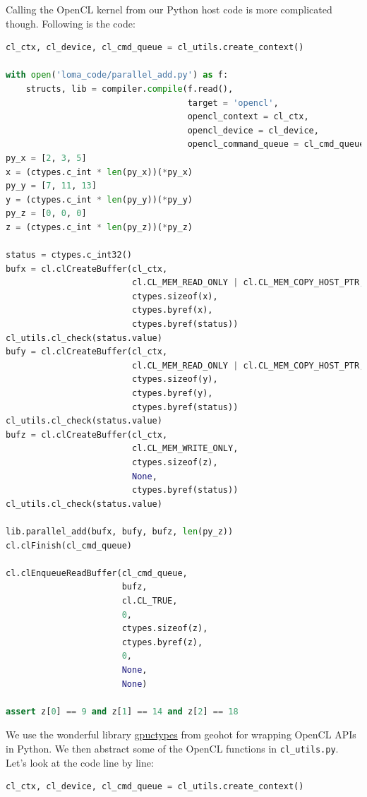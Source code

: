 Calling the OpenCL kernel from our Python host code is more complicated though. Following is the code:
\begin{lstlisting}[language=python]
cl_ctx, cl_device, cl_cmd_queue = cl_utils.create_context()

with open('loma_code/parallel_add.py') as f:
    structs, lib = compiler.compile(f.read(),
                                    target = 'opencl',
                                    opencl_context = cl_ctx,
                                    opencl_device = cl_device,
                                    opencl_command_queue = cl_cmd_queue)
py_x = [2, 3, 5]
x = (ctypes.c_int * len(py_x))(*py_x)
py_y = [7, 11, 13]
y = (ctypes.c_int * len(py_y))(*py_y)
py_z = [0, 0, 0]
z = (ctypes.c_int * len(py_z))(*py_z)

status = ctypes.c_int32()
bufx = cl.clCreateBuffer(cl_ctx,
                         cl.CL_MEM_READ_ONLY | cl.CL_MEM_COPY_HOST_PTR,
                         ctypes.sizeof(x),
                         ctypes.byref(x),
                         ctypes.byref(status))
cl_utils.cl_check(status.value)
bufy = cl.clCreateBuffer(cl_ctx,
                         cl.CL_MEM_READ_ONLY | cl.CL_MEM_COPY_HOST_PTR,
                         ctypes.sizeof(y),
                         ctypes.byref(y),
                         ctypes.byref(status))
cl_utils.cl_check(status.value)
bufz = cl.clCreateBuffer(cl_ctx,
                         cl.CL_MEM_WRITE_ONLY,
                         ctypes.sizeof(z),
                         None,
                         ctypes.byref(status))
cl_utils.cl_check(status.value)

lib.parallel_add(bufx, bufy, bufz, len(py_z))
cl.clFinish(cl_cmd_queue)

cl.clEnqueueReadBuffer(cl_cmd_queue,
                       bufz,
                       cl.CL_TRUE,
                       0,
                       ctypes.sizeof(z),
                       ctypes.byref(z),
                       0,
                       None,
                       None)

assert z[0] == 9 and z[1] == 14 and z[2] == 18
\end{lstlisting}
We use the wonderful library \href{https://github.com/tinygrad/gpuctypes}{gpuctypes} from geohot for wrapping OpenCL APIs in Python. We then abstract some of the OpenCL functions in \lstinline{cl_utils.py}. Let's look at the code line by line:
\begin{lstlisting}[language=python]
cl_ctx, cl_device, cl_cmd_queue = cl_utils.create_context()
\end{lstlisting}
